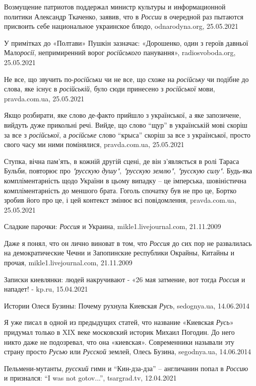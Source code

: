Возмущение патриотов поддержал министр культуры и информационной политики
Александр Ткаченко, заявив, что в \emph{России} в очередной раз пытаются
присвоить себе национальное украинское блюдо, odnarodyna.org, 25.05.2021

У примітках до «Полтави» Пушкін зазначає: «Дорошенко, один з героїв давньої
Мало\emph{росії}, непримиренний ворог \emph{російського} панування»,
radiosvoboda.org, 25.05.2021

Не все, що звучить по-\emph{російськи} чи не все, що схоже на \emph{російську}
чи подібне до слова, яке існує в \emph{російській}, було сюди принесено з
\emph{російської} мови, pravda.com.ua, 25.05.2021

Якщо розбирати, яке слово де-факто прийшло з української, а яке запозичене,
вийдуть дуже прикольні речі. Вийде, що слово \enquote{щур} в українській мові скоріш за
все з \emph{російської}, а \emph{російське} слово \enquote{крыса} скоріш за все з української, просто
свого часу ми ними помінялися, pravda.com.ua, 25.05.2021

Ступка, вічна пам'ять, в кожній другій сцені, де він з'являється в ролі Тараса
Бульби, повторює про \emph{"русскую душу"}, \emph{"русскую землю"},
\emph{"русскую силу"}. Будь-яка компліментарність щодо України в цьому випадку
– це імперська, шовіністична компліментарність до меншого брата. Гоголь
спочатку був не про це, Бортко зробив його про це, і цей контекст змінює всі
повідомлення, pravda.com.ua, 25.05.2021

Сладкие парочки: \emph{Россия} и Украина, mikle1.livejournal.com, 21.11.2009

Даже я понял, что он лично виноват в том, что \emph{Россия} до сих пор не
развалилась на демократические Чечни и Запопинские республики Окрайны, Китайны
и прочая, mikle1.livejournal.com, 21.11.2009

Записки киевлянки: людей накручивают - «26 мая затмение, вот тогда
\emph{Россия} и нападет! - kp.ru, 15.04.2021

Истории Олеся Бузины: Почему рухнула Киевская \emph{Русь}, sedognya.ua, 14.06.2014

Я уже писал в одной из предыдущих статей, что название «Киевская \emph{Русь}»
придумал только в XIX веке московский историк Михаил Погодин. До него никто
даже не подозревал, что она «киевская». Современники называли эту страну просто
\emph{Русью} или \emph{Русской} землей, Олесь Бузина, segodnya.ua, 14.06.2014

Пельмени-мутанты, \emph{русский} гимн и \enquote{Кин-дза-дза} – англичанин
попал в \emph{Россию} и признался: \enquote{I was not gotov...}, tsargrad.tv,
12.04.2021

